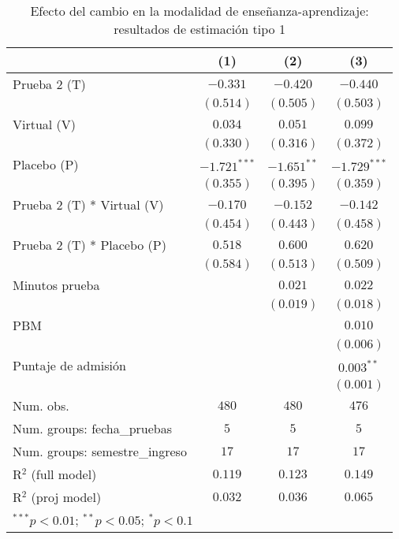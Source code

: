 
\begin{table}
\begin{center}
\begin{tabular}{l c c c}
\hline
 & (1) & (2) & (3) \\
\hline
Prueba 2 (T)                   & $-0.331$       & $-0.420$      & $-0.440$       \\
                               & $(0.514)$      & $(0.505)$     & $(0.503)$      \\
Virtual (V)                    & $0.034$        & $0.051$       & $0.099$        \\
                               & $(0.330)$      & $(0.316)$     & $(0.372)$      \\
Placebo (P)                    & $-1.721^{***}$ & $-1.651^{**}$ & $-1.729^{***}$ \\
                               & $(0.355)$      & $(0.395)$     & $(0.359)$      \\
Prueba 2 (T) * Virtual (V)     & $-0.170$       & $-0.152$      & $-0.142$       \\
                               & $(0.454)$      & $(0.443)$     & $(0.458)$      \\
Prueba 2 (T) * Placebo (P)     & $0.518$        & $0.600$       & $0.620$        \\
                               & $(0.584)$      & $(0.513)$     & $(0.509)$      \\
Minutos prueba                 &                & $0.021$       & $0.022$        \\
                               &                & $(0.019)$     & $(0.018)$      \\
PBM                            &                &               & $0.010$        \\
                               &                &               & $(0.006)$      \\
Puntaje de admisión            &                &               & $0.003^{**}$   \\
                               &                &               & $(0.001)$      \\
\hline
Num. obs.                      & $480$          & $480$         & $476$          \\
Num. groups: fecha\_pruebas    & $5$            & $5$           & $5$            \\
Num. groups: semestre\_ingreso & $17$           & $17$          & $17$           \\
R$^2$ (full model)             & $0.119$        & $0.123$       & $0.149$        \\
R$^2$ (proj model)             & $0.032$        & $0.036$       & $0.065$        \\
\hline
\multicolumn{4}{l}{\scriptsize{$^{***}p<0.01$; $^{**}p<0.05$; $^{*}p<0.1$}}
\end{tabular}
\caption{Efecto del cambio en la modalidad de enseñanza-aprendizaje: resultados de estimación tipo 1}
\label{tab:regresiones_efectos_fijos_tipo1}
\end{center}
\end{table}
